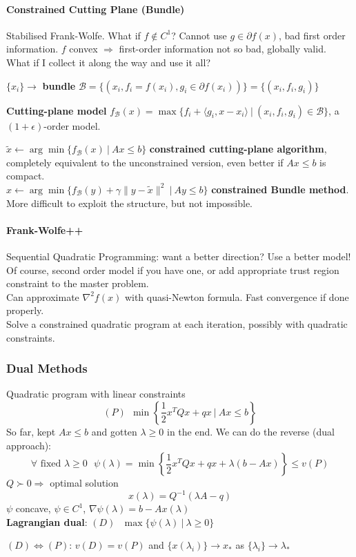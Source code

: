 \documentclass[10pt]{report}
\begin{document}
\paragraph{Constrained Cutting Plane (Bundle)} Stabilised Frank-Wolfe. What if $f\not\in C^1$? Cannot use $g\in\partial f(x)$, bad first order information. $f$ convex $\Rightarrow$ first-order information not so bad, globally valid.\\
What if I collect it along the way and use it all?
\begin{list}{}{}
	\item $\{x_i\}\rightarrow$ \textbf{bundle} $\mathscr{B}=\{(x_i, f_i = f(x_i), g_i\in\partial f(x_i))\} = \{(x_i, f_i, g_i)\}$
	\item \textbf{Cutting-plane model} $f_\mathscr{B}(x) = \max\{f_i+\langle g_i, x-x_i\rangle\:|\:(x_i, f_i, g_i)\in \mathscr{B}\}$, a $(1+\epsilon)$-order model.
\end{list}
$\tilde{x}\leftarrow \arg\min\{f_\mathscr{B}(x)\:|\:Ax\leq b\}$ \textbf{constrained cutting-plane algorithm}, completely equivalent to the unconstrained version, even better if $Ax\leq b$ is compact.\\
$x\leftarrow \arg\min\{f_\mathscr{B}(y)+\gamma\|y-\tilde{x}\|^2\:|\:Ay\leq b\}$ \textbf{constrained Bundle method}.\\
More difficult to exploit the structure, but not impossible.
\paragraph{Frank-Wolfe++} Sequential Quadratic Programming: want a better direction? Use a better model! Of course, second order model if you have one, or add appropriate trust region constraint to the master problem.\\
Can approximate $\nabla^2 f(x)$ with quasi-Newton formula. Fast convergence if done properly.\\
Solve a constrained quadratic program at each iteration, possibly with quadratic constraints.
\subsubsection{Dual Methods}
Quadratic program with linear constraints $$(P)\:\:\min\left\{\frac{1}{2}x^TQx+qx\:|\:Ax\leq b\right\}$$
So far, kept $Ax\leq b$ and gotten $\lambda \geq 0$ in the end. We can do the reverse (dual approach):
$$\forall\text{ fixed }\lambda\geq 0\:\:\:\psi(\lambda)=\min\left\{\frac{1}{2}x^TQx + qx + \lambda(b-Ax)\right\}\leq v(P)$$
$Q\succ 0\Rightarrow$ optimal solution $$x(\lambda)=Q^{-1}(\lambda A-q)$$
$\psi$ concave, $\psi\in C^1$, $\nabla\psi(\lambda)=b-Ax(\lambda)$\\
\textbf{Lagrangian dual}: $(D)\:\:\:\max\{\psi(\lambda)\:|\:\lambda\geq 0\}$
\begin{list}{}{}
	\item $(D)\Leftrightarrow (P)$: $v(D) = v(P)$ and $\{x(\lambda_i)\}\rightarrow x_*$ as $\{\lambda_i\}\rightarrow \lambda_*$
\end{list}
\end{document}
